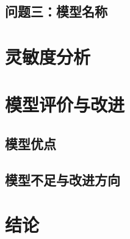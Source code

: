 \documentclass[withoutpreface,bwprint]{cumcmthesis}
\begin{document}
\subsection{问题三：模型名称}

\section{灵敏度分析}

\section{模型评价与改进}
\subsection{模型优点}
\subsection{模型不足与改进方向}

\section{结论}

\end{document}
